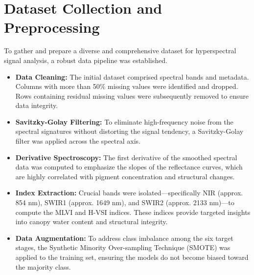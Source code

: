 \documentclass[ 12pt,a4paper,twocolumn,fleqn]{report}
\begin{document}
\section{Dataset Collection and Preprocessing}
\vspace{2mm}
To gather and prepare a diverse and comprehensive dataset for hyperspectral signal analysis, a robust data pipeline was established.

\begin{itemize}
    \item \textbf{Data Cleaning:} The initial dataset comprised spectral bands and metadata. Columns with more than 50\% missing values were identified and dropped. Rows containing residual missing values were subsequently removed to ensure data integrity.
    \item \textbf{Savitzky-Golay Filtering:} To eliminate high-frequency noise from the spectral signatures without distorting the signal tendency, a Savitzky-Golay filter was applied across the spectral axis.
    \item \textbf{Derivative Spectroscopy:} The first derivative of the smoothed spectral data was computed to emphasize the slopes of the reflectance curves, which are highly correlated with pigment concentration and structural changes.
    \item \textbf{Index Extraction:} Crucial bands were isolated—specifically NIR (approx. 854 nm), SWIR1 (approx. 1649 nm), and SWIR2 (approx. 2133 nm)—to compute the MLVI and H-VSI indices. These indices provide targeted insights into canopy water content and structural integrity.
    \item \textbf{Data Augmentation:} To address class imbalance among the six target stages, the Synthetic Minority Over-sampling Technique (SMOTE) was applied to the training set, ensuring the models do not become biased toward the majority class.
\end{itemize}
\end{document}
